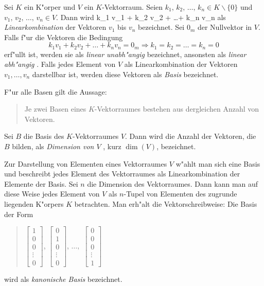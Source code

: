 Sei $K$ ein K"orper und $V$ ein $K$-Vektorraum.
Seien $k_1,\, k_2, \, \ldots, \, k_n \in K \backslash \{ 0 \} $ 
und $v_1, \, v_2, \, \ldots, \, v_n \in V$.
Dann wird
   k_1 v_1 + k_2 v_2 + \ldots + k_n v_n 
\Eeq
als  {\em Linearkombination} der Vektoren 
$v_1$ bis $v_n$ bezeichnet.
Sei $0_m$ der Nullvektor in $V$.
Falls f"ur die Vektoren die Bedingung
\[ k_1 v_1 + k_2 v_2 + \ldots + k_n v_n = 0_m \Rightarrow
   k_1 = k_2 = \ldots = k_n = 0
\]
erf"ullt ist, werden sie als 
{\em linear unabh"angig}  bezeichnet, 
ansonsten als {\em linear abh"angig} .
Falls jedes Element von $V$ als Linearkombination der Vektoren 
$v_1,\ldots,v_n$
darstellbar ist, werden diese Vektoren als 
 {\em Basis} bezeichnet.

F"ur alle Basen gilt die Aussage: \nopagebreak
\begin{quote}
    Je zwei Basen eines $K$-Vektorraumes bestehen aus dergleichen 
    Anzahl von Vektoren.
\end{quote}
Sei $B$ die Basis des $K$-Vektorraumes $V$. Dann wird die Anzahl 
der Vektoren, die $B$ bilden, 
als {\em Dimension von $V$}  , 
kurz $\dim(V)$, bezeichnet.

Zur Darstellung von Elementen eines Vektorraumes $V$ w"ahlt man sich eine
Basis und beschreibt jedes Element des Vektorraumes als Linearkombination
der Elemente der Basis. Sei $n$ die Dimension des Vektorraumes. Dann
kann man auf diese Weise jedes Element von $V$ als $n$-Tupel von Elementen
des zugrunde liegenden K"orpers $K$ betrachten. Man erh"alt die
Vektorschreibweise:
\Eeq
Die Basis der Form
\begin{quote} %
   $\left[ \begin{array}{c} 1\\ 0\\ 0\\ \vdots\\ 0\end{array} \right]$,
   \hspace{0.7em}
   $\left[ \begin{array}{c} 0\\ 1\\ 0\\ \vdots\\ 0\end{array} \right]$,
   $\ldots , $ \hspace{0.7em}
   $\left[ \begin{array}{c} 0\\ 0\\ 0\\ \vdots\\ 1 \end{array} \right]$
\end{quote}
wird als
{\em kanonische Basis}  bezeichnet.

